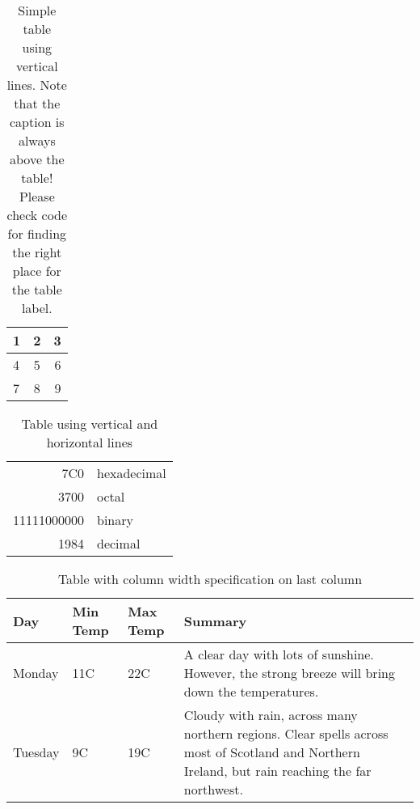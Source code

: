 \begin{table}[h]
\caption{Simple table using vertical lines. Note that the caption is always above the table! Please check code for finding the right place for the table label.\label{tab:help1}}
\centering
  \begin{tabular}{ l | c || r | }
    \hline
    1 & 2 & 3 \\ \hline
    4 & 5 & 6 \\ \hline
    7 & 8 & 9 \\
    \hline
  \end{tabular}
\end{table}

\begin{table}[h]
\caption{Table using vertical and horizontal lines\label{tab:help2}}
\centering
\begin{tabular}{|r|l|}
  \hline
  7C0 & hexadecimal \\
  3700 & octal \\ \cline{2-2}
  11111000000 & binary \\
  \hline \hline
  1984 & decimal \\
  \hline
\end{tabular}
\end{table}

\begin{table}[h]
\caption{Table with column width specification on last column\label{tab:help3}}
\centering
    \begin{tabular}{ | l | l | l | p{5cm} |}
    \hline
    Day & Min Temp & Max Temp & Summary \\ \hline
    Monday & 11C & 22C & A clear day with lots of sunshine.  
    However, the strong breeze will bring down the temperatures. \\ \hline
    Tuesday & 9C & 19C & Cloudy with rain, across many northern regions. Clear spells
    across most of Scotland and Northern Ireland,
    but rain reaching the far northwest. \\
    \hline
    \end{tabular}
\end{table}

